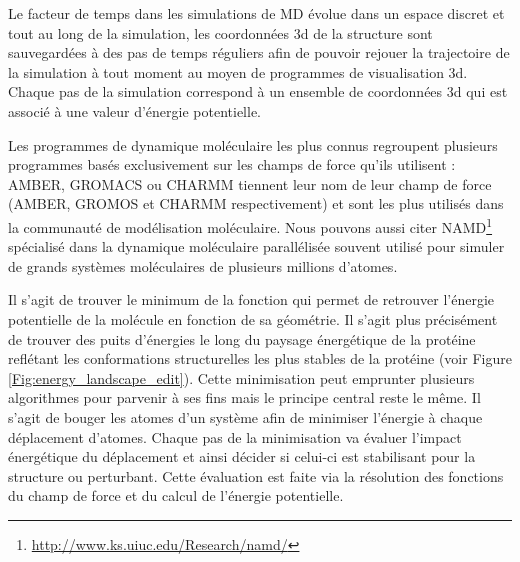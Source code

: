 
Le facteur de temps dans les simulations de MD évolue dans un espace discret et tout au long de la simulation, les coordonnées 3d de la structure sont sauvegardées à des pas de temps réguliers afin de pouvoir rejouer la trajectoire de la simulation à tout moment au moyen de programmes de visualisation 3d. Chaque pas de la simulation correspond à un ensemble de coordonnées 3d qui est associé à une valeur d'énergie potentielle.

Les programmes de dynamique moléculaire les plus connus regroupent plusieurs programmes basés exclusivement sur les champs de force qu'ils utilisent : AMBER, GROMACS ou CHARMM tiennent leur nom de leur champ de force (AMBER, GROMOS et CHARMM respectivement) et sont les plus utilisés dans la communauté de modélisation moléculaire. Nous pouvons aussi citer NAMD\footnote{\url{http://www.ks.uiuc.edu/Research/namd/}} \cite{phillips2005scalable} spécialisé dans la dynamique moléculaire parallélisée souvent utilisé pour simuler de grands systèmes moléculaires de plusieurs millions d'atomes.


Il s'agit de trouver le minimum de la fonction qui permet de retrouver l'énergie potentielle de la molécule en fonction de sa géométrie. Il s'agit plus précisément de trouver des puits d'énergies le long du paysage énergétique de la protéine reflétant les conformations structurelles les plus stables de la protéine (voir Figure \ref{Fig:energy_landscape_edit}). Cette minimisation peut emprunter plusieurs algorithmes pour parvenir à ses fins mais le principe central reste le même. Il s'agit de bouger les atomes d'un système afin de minimiser l'énergie à chaque déplacement d'atomes. Chaque pas de la minimisation va évaluer l'impact énergétique du déplacement et ainsi décider si celui-ci est stabilisant pour la structure ou perturbant. Cette évaluation est faite via la résolution des fonctions du champ de force et du calcul de l'énergie potentielle.


